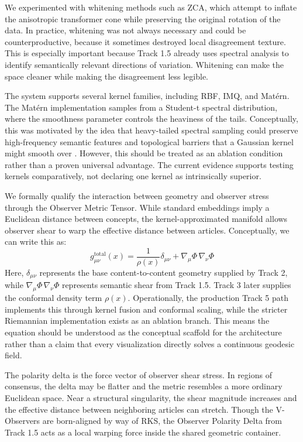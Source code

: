 We experimented with whitening methods such as ZCA, which attempt to inflate the anisotropic transformer cone while preserving the original rotation of the data. In practice, whitening was not always necessary and could be counterproductive, because it sometimes destroyed local disagreement texture. This is especially important because Track 1.5 already uses spectral analysis to identify semantically relevant directions of variation. Whitening can make the space cleaner while making the disagreement less legible.

The system supports several kernel families, including RBF, IMQ, and Mat\'{e}rn. The Mat\'{e}rn implementation samples from a Student-t spectral distribution, where the smoothness parameter controls the heaviness of the tails. Conceptually, this was motivated by the idea that heavy-tailed spectral sampling could preserve high-frequency semantic features and topological barriers that a Gaussian kernel might smooth over \citep{rasmussen2006}. However, this should be treated as an ablation condition rather than a proven universal advantage. The current evidence supports testing kernels comparatively, not declaring one kernel as intrinsically superior.

We formally qualify the interaction between geometry and observer stress through the Observer Metric Tensor. While standard embeddings imply a Euclidean distance between concepts, the kernel-approximated manifold allows observer shear to warp the effective distance between articles. Conceptually, we can write this as:
\begin{equation}
    g_{\mu\nu}^{\text{total}}(x) = \frac{1}{\rho(x)}\delta_{\mu\nu} + \nabla_\mu \Phi\, \nabla_\nu \Phi
\end{equation}
Here, $\delta_{\mu\nu}$ represents the base content-to-content geometry supplied by Track 2, while $\nabla_\mu \Phi\, \nabla_\nu \Phi$ represents semantic shear from Track 1.5. Track 3 later supplies the conformal density term $\rho(x)$. Operationally, the production Track 5 path implements this through kernel fusion and conformal scaling, while the stricter Riemannian implementation exists as an ablation branch. This means the equation should be understood as the conceptual scaffold for the architecture rather than a claim that every visualization directly solves a continuous geodesic field.

The polarity delta is the force vector of observer shear stress. In regions of consensus, the delta may be flatter and the metric resembles a more ordinary Euclidean space. Near a structural singularity, the shear magnitude increases and the effective distance between neighboring articles can stretch. Though the V-Observers are born-aligned by way of RKS, the Observer Polarity Delta from Track 1.5 acts as a local warping force inside the shared geometric container.

